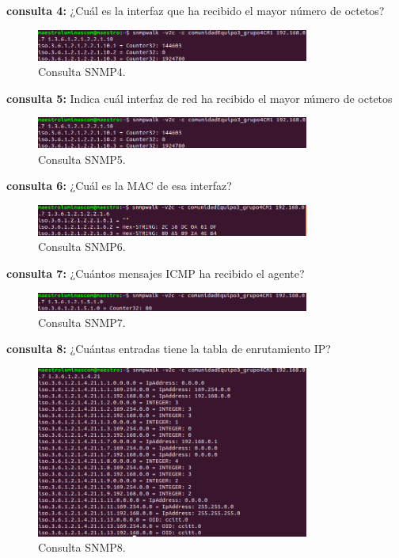 \textbf{consulta 4:} ¿Cuál es la interfaz que ha recibido el mayor número de octetos?

\begin{figure}[htbp!]
	\centering
		\includegraphics[width=0.8\textwidth]{images/capturas/pregunta4}
	\caption{Consulta SNMP4.}
\end{figure}

\textbf{consulta 5:} Indica cuál interfaz de red ha recibido el mayor número de octetos

\begin{figure}[htbp!]
	\centering
		\includegraphics[width=0.8\textwidth]{images/capturas/pregunta5}
	\caption{Consulta SNMP5.}
\end{figure}

\pagebreak
\textbf{consulta 6:} ¿Cuál es la MAC de esa interfaz?

\begin{figure}[htbp!]
	\centering
		\includegraphics[width=0.8\textwidth]{images/capturas/pregunta6}
	\caption{Consulta SNMP6.}
\end{figure}

\textbf{consulta 7:} ¿Cuántos mensajes ICMP ha recibido el agente?

\begin{figure}[htbp!]
	\centering
		\includegraphics[width=0.8\textwidth]{images/capturas/pregunta7}
	\caption{Consulta SNMP7.}
\end{figure}

\textbf{consulta 8:} ¿Cuántas entradas tiene la tabla de enrutamiento IP?

\begin{figure}[htbp!]
	\centering
		\includegraphics[width=0.8\textwidth]{images/capturas/pregunta8}
	\caption{Consulta SNMP8.}
\end{figure}

